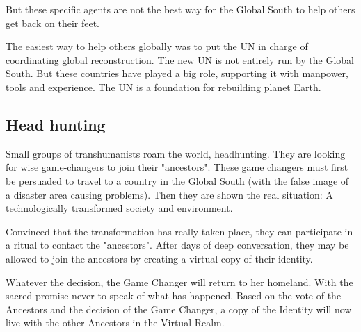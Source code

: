 But these specific agents are not the best way for the Global South to help others get back on their feet.

The easiest way to help others globally was to put the UN in charge of coordinating global reconstruction. The new UN is not entirely run by the Global South. But these countries have played a big role, supporting it with manpower, tools and experience. The UN is a foundation for rebuilding planet Earth.

\subsection{Head hunting}

Small groups of transhumanists roam the world, headhunting. They are looking for wise game-changers to join their "ancestors". These game changers must first be persuaded to travel to a country in the Global South (with the false image of a disaster area causing problems).
Then they are shown the real situation: A technologically transformed society and environment.

Convinced that the transformation has really taken place, they can participate in a ritual to contact the "ancestors". After days of deep conversation, they may be allowed to join the ancestors by creating a virtual copy of their identity.

Whatever the decision, the Game Changer will return to her homeland. With the sacred promise never to speak of what has happened. Based on the vote of the Ancestors and the decision of the Game Changer, a copy of the Identity will now live with the other Ancestors in the Virtual Realm.






